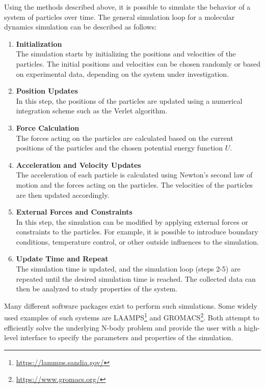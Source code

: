 Using the methods described above, it is possible to simulate the behavior of a system of particles over time. The general simulation loop for a molecular dynamics simulation can be described as follows:

\begin{enumerate}
      \item \textbf{Initialization} \\
            The simulation starts by initializing the positions and velocities of the particles. The initial positions and velocities can be chosen randomly or based on experimental data, depending on the system under investigation.

      \item \textbf{Position Updates} \\
            In this step, the positions of the particles are updated using a numerical integration scheme such as the Verlet algorithm.

      \item \textbf{Force Calculation} \\
            The forces acting on the particles are calculated based on the current positions of the particles and the chosen potential energy function $U$.

      \item \textbf{Acceleration and Velocity Updates} \\
            The acceleration of each particle is calculated using Newton's second law of motion and the forces acting on the particles. The velocities of the particles are then updated accordingly.

      \item \textbf{External Forces and Constraints} \\
            In this step, the simulation can be modified by applying external forces or constraints to the particles. For example, it is possible to introduce boundary conditions, temperature control, or other outside influences to the simulation.

      \item \textbf{Update Time and Repeat} \\
            The simulation time is updated, and the simulation loop (steps 2-5)
            are repeated until the desired simulation time is reached. The collected data can then be analyzed to study properties of the system.
\end{enumerate}


Many different software packages exist to perform such simulations. Some widely used examples of such systems are LAAMPS\footnote{\url{https://lammps.sandia.gov/}} and GROMACS\footnote{\url{https://www.gromacs.org/}}. Both attempt to efficiently solve the underlying N-body problem and provide the user with a high-level interface to specify the parameters and properties of the simulation.

